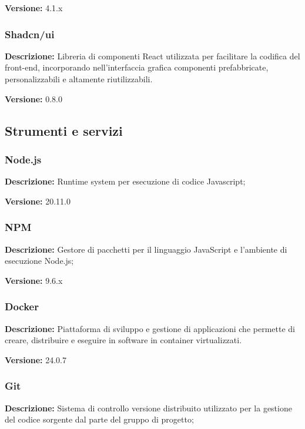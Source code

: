 \textbf{Versione:} 4.1.x

\subsubsection{Shadcn/ui}

\textbf{Descrizione:} Libreria di componenti React utilizzata per facilitare la codifica del front-end, incorporando
nell’interfaccia grafica componenti prefabbricate, personalizzabili e altamente riutilizzabili.

\textbf{Versione:} 0.8.0


\subsection{Strumenti e servizi}

\subsubsection{Node.js}

\textbf{Descrizione:} Runtime system per esecuzione di codice Javascript;

\textbf{Versione:} 20.11.0

\subsubsection{NPM}

\textbf{Descrizione:} Gestore di pacchetti per il linguaggio JavaScript e l'ambiente di esecuzione Node.js;

\textbf{Versione:} 9.6.x

\subsubsection{Docker}

\textbf{Descrizione:} Piattaforma di sviluppo e gestione di applicazioni che permette di creare, distribuire e eseguire in software in container virtualizzati.

\textbf{Versione:} 24.0.7


\subsubsection{Git}

\textbf{Descrizione:} Sistema di controllo versione distribuito utilizzato per la gestione del codice sorgente dal parte del gruppo di progetto;

